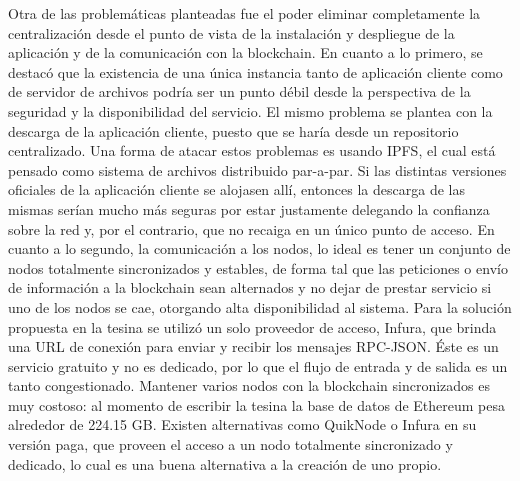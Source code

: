 Otra de las problemáticas planteadas fue el poder eliminar completamente la centralización desde el punto de vista de la instalación y despliegue de la aplicación y de la comunicación con la blockchain. En cuanto a lo primero, se destacó que la existencia de una única instancia tanto de aplicación cliente como de servidor de archivos podría ser un punto débil desde la perspectiva de la seguridad y la disponibilidad del servicio. El mismo problema se plantea con la descarga de la aplicación cliente, puesto que se haría desde un repositorio centralizado. Una forma de atacar estos problemas es usando IPFS\cite{Ipfs2019}, el cual está pensado como sistema de archivos distribuido par-a-par. Si las distintas versiones oficiales de la aplicación cliente se alojasen allí, entonces la descarga de las mismas serían mucho más seguras por estar justamente delegando la confianza sobre la red y, por el contrario, que no recaiga en un único punto de acceso. En cuanto a lo segundo, la comunicación a los nodos, lo ideal es tener un conjunto de nodos totalmente sincronizados y estables, de forma tal que las peticiones o envío de información a la blockchain sean alternados y no dejar de prestar servicio si uno de los nodos se cae, otorgando alta disponibilidad al sistema. Para la solución propuesta en la tesina se utilizó un solo proveedor de acceso, Infura, que brinda una URL de conexión para enviar y recibir los mensajes RPC-JSON. Éste es un servicio gratuito y no es dedicado, por lo que el flujo de entrada y de salida es un tanto congestionado. Mantener varios nodos con la blockchain sincronizados es muy costoso: al momento de escribir la tesina la base de datos de Ethereum pesa alrededor de 224.15 GB. Existen alternativas como QuikNode\cite{Quiknode2019} o Infura en su versión paga, que proveen el acceso a un nodo totalmente sincronizado y dedicado, lo cual es una buena alternativa a la creación de uno propio.

